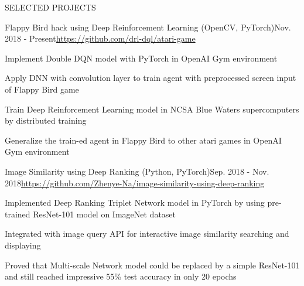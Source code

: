 \documentclass{resume} %
\begin{document}

\begin{rSection}{SELECTED PROJECTS}


\begin{rSubsection}{Flappy Bird hack using Deep Reinforcement Learning (OpenCV, PyTorch)}{Nov. 2018 - Present}{\url{https://github.com/drl-dql/atari-game}}{}
\item Implement Double DQN model with PyTorch in OpenAI Gym environment
\item Apply DNN with convolution layer to train agent with preprocessed screen input of Flappy Bird game
\item Train Deep Reinforcement Learning model in NCSA Blue Waters supercomputers by distributed training
\item Generalize the train-ed agent in Flappy Bird to other atari games in OpenAI Gym environment
\end{rSubsection}



\begin{rSubsection}{Image Similarity using Deep Ranking (Python, PyTorch)}{Sep. 2018 - Nov. 2018}{\url{https://github.com/Zhenye-Na/image-similarity-using-deep-ranking}}{}
\item Implemented Deep Ranking Triplet Network model in PyTorch by using pre-trained ResNet-101 model on ImageNet dataset
\item Integrated with image query API for interactive image similarity searching and displaying
\item Proved that Multi-scale Network model could be replaced by a simple ResNet-101 and still reached impressive 55\% test accuracy in only 20 epochs
\end{rSubsection}




\end{rSection}
\end{document}
